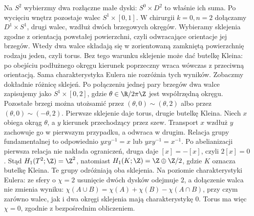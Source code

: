 \begin{przyklad}
Na $S^2$ wybierzmy
dwa rozłączne
małe dyski:
$S^0\times D^2$
to właśnie ich suma.
Po wycięciu wnętrz
pozostaje walec
$S^1\times[0,1]$.
W chirurgii
$k=0,n=2$
dołączamy
$D^1\times S^1$,
drugi walec,
wzdłuż dwóch
brzegowych okręgów.
Wybieramy sklejenia zgodne z orientacją powstałej
powierzchni, czyli odwracające orientacje jej brzegów.
Wtedy dwa walce składają się w zorientowaną zamkniętą
powierzchnię rodzaju jeden, czyli torus. Bez tego
warunku sklejenie może dać butelkę Kleina:
po obejściu podłużnego okręgu kierunek poprzeczny
wraca wówczas z przeciwną orientacją. Sama
charakterystyka Eulera nie rozróżnia tych wyników.
Zobaczmy dokładnie różnicę sklejeń. Po połączeniu
jednej pary brzegów dwa walce zapisujemy jako
$S^1\times[0,2]$, gdzie $\theta\in\R/2\pi\Z$
jest współrzędną okręgu. Pozostałe brzegi można utożsamić
przez $(\theta,0)\sim(\theta,2)$ albo przez
$(\theta,0)\sim(-\theta,2)$.
Pierwsze sklejenie daje torus, drugie butelkę Kleina.
Niech $x$ obiega okrąg $\theta$, a $y$ kierunek
przechodzący przez szew. Transport $x$ wzdłuż $y$
zachowuje go w pierwszym przypadku, a odwraca w drugim.
Relacja grupy fundamentalnej to odpowiednio
$yxy^{-1}=x$ lub $yxy^{-1}=x^{-1}$.
Po abelianizacji pierwsza relacja nie nakłada
ograniczeń, druga daje $[x]=-[x]$, czyli $2[x]=0$.
Stąd $H_1(T^2;\Z)=\Z^2$, natomiast
$H_1(K;\Z)=\Z\oplus\Z/2$, gdzie $K$ oznacza butelkę Kleina.
Te grupy odróżniają oba sklejenia.
Na poziomie
charakterystyki
Eulera: ze sfery
o $\chi=2$ usunięcie
dwóch dysków
odejmuje $2$,
a dołączenie walca nie zmienia wyniku:
$\chi(A\cup B)=\chi(A)+\chi(B)-\chi(A\cap B)$,
przy czym zarówno walec, jak i dwa okręgi sklejenia
mają charakterystykę $0$.
Torus ma więc
$\chi=0$, zgodnie
z bezpośrednim
obliczeniem.
\end{przyklad}

